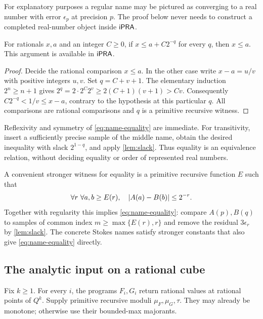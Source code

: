 For explanatory purposes a regular name may be pictured as converging to a
real number with error $\epsilon_p$ at precision $p$. The proof below never
needs to construct a completed real-number object inside $\mathsf{iPRA}$.

\begin{lemma}\label{lem:slack}
For rationals $x,a$ and an integer $C\ge0$, if
$x\le a+C2^{-q}$ for every $q$, then $x\le a$. This argument is available in
$\mathsf{iPRA}$.
\end{lemma}
\begin{proof}
Decide the rational comparison $x\le a$. In the other case write
$x-a=u/v$ with positive integers $u,v$. Set $q=C+v+1$.
The elementary induction $2^n\ge n+1$ gives
$2^q=2\cdot2^C2^v\ge2(C+1)(v+1)>Cv$.
Consequently $C2^{-q}<1/v\le x-a$, contrary to the hypothesis at this
particular $q$. All comparisons are rational comparisons and $q$ is a
primitive recursive witness.
\end{proof}

Reflexivity and symmetry of \eqref{eq:name-equality} are immediate.
For transitivity, insert a sufficiently precise sample of the middle name,
obtain the desired inequality with slack $2^{1-q}$, and apply
\cref{lem:slack}. Thus equality is an equivalence relation, without deciding
equality or order of represented real numbers.

A convenient stronger witness for equality is a primitive recursive
function $E$ such that
\begin{equation}\label{eq:tail-equality}
 \forall r\ \forall a,b\ge E(r),\quad
 \left|A(a)-B(b)\right|\le2^{-r}.
\end{equation}
Together with regularity this implies \eqref{eq:name-equality}: compare
$A(p),B(q)$ to samples of common index
$m\ge\max\{E(r),r\}$ and remove the residual $3\epsilon_r$ by
\cref{lem:slack}. The concrete Stokes names satisfy stronger constants
that also give \eqref{eq:name-equality} directly.

\subsection{The analytic input on a rational cube}\label{sec:certificates}

Fix $k\ge1$. For every $i$, the programs $F_i,G_i$ return rational values
at rational points of $Q^k$. Supply primitive recursive moduli
$\mu_F,\mu_G,\tau$. They may already be monotone; otherwise use their
bounded-max majorants.

